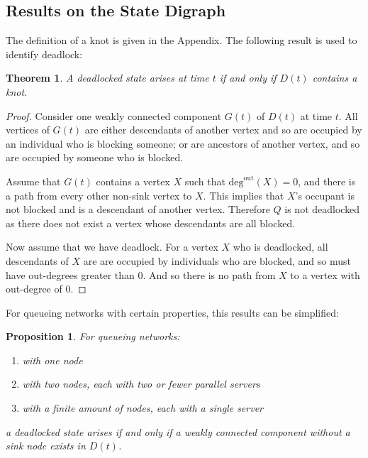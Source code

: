 \documentclass{article}
\newtheorem{theorem}{Theorem}
\newtheorem{proposition}{Proposition}
\begin{document}
\subsection{Results on the State Digraph}

The definition of a knot is given in the Appendix.
The following result is used to identify deadlock:\\

\begin{theorem}
A deadlocked state arises at time $t$ if and only if $D(t)$ contains a knot.
\end{theorem}

\begin{proof}
Consider one weakly connected component $G(t)$ of $D(t)$ at time $t$.
All vertices of $G(t)$ are either descendants of another vertex and so are occupied by an individual who is blocking someone; or are ancestors of another vertex, and so are occupied by someone who is blocked.

Assume that $G(t)$ contains a vertex $X$ such that $\text{deg}^{\text{out}}(X) = 0$, and there is a path from every other non-sink vertex to $X$.
This implies that $X$'s occupant is not blocked and is a descendant of another vertex.
Therefore $Q$ is not deadlocked as there does not exist a vertex whose descendants are all blocked.

Now assume that we have deadlock.
For a vertex $X$ who is deadlocked, all descendants of $X$ are are occupied by individuals who are blocked, and so must have out-degrees greater than 0.
And so there is no path from $X$ to a vertex with out-degree of 0.

\end{proof}


For queueing networks with certain properties, this results can be simplified:\\

\begin{proposition}
For queueing networks:
\begin{enumerate}
  \item with one node
  \item with two nodes, each with two or fewer parallel servers
  \item with a finite amount of nodes, each with a single server
\end{enumerate}
a deadlocked state arises if and only if a weakly connected component without a sink node exists in $D(t)$.
\end{proposition}
\end{document}
